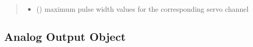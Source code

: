 \documentclass[letterpaper,10pt,english]{sphinxmanual}
\begin{document}
\begin{fulllineitems}
\begin{fulllineitems}
\begin{quote}
\begin{description}
\begin{itemize}
\item {} 
\sphinxAtStartPar
{} (\sphinxstyleliteralemphasis{\sphinxupquote{{[}}}\sphinxstyleliteralemphasis{\sphinxupquote{{]}}}) \textendash{} maximum pulse width values for the corresponding 
servo channel

\end{itemize}

\end{description}\end{quote}

\end{fulllineitems}


\end{fulllineitems}



\subsection{Analog Output Object}
\label{\detokenize{generic:module-AnalogOutputObject}}\label{\detokenize{generic:analog-output-object}}
\end{document}
